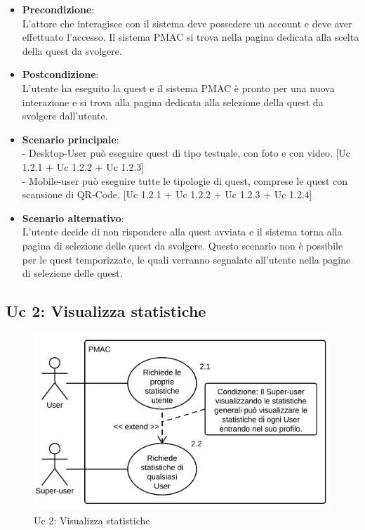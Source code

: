 {\begin{itemize}
\item \textbf{Precondizione}:\\
L'attore che interagisce con il sistema deve possedere un account e deve aver effettuato l'accesso. Il sistema PMAC si trova nella pagina dedicata alla scelta della quest da svolgere.

\item \textbf{Postcondizione}:\\
L'utente ha eseguito la quest e il sistema PMAC è pronto per una nuova interazione e si trova alla pagina dedicata alla selezione della quest da svolgere dall'utente.

\item \textbf{Scenario principale}:\\
- Desktop-User può eseguire quest di tipo testuale, con foto e con video. [Uc 1.2.1 + Uc 1.2.2 + Uc 1.2.3]\\
- Mobile-user può eseguire tutte le tipologie di quest, comprese le quest con scansione di QR-Code. [Uc 1.2.1 + Uc 1.2.2 + Uc 1.2.3 + Uc 1.2.4]

\item \textbf{Scenario alternativo}:\\
L'utente decide di non rispondere alla quest avviata e il sistema torna alla pagina di selezione delle quest da svolgere. Questo scenario non è possibile per le quest temporizzate, le quali verranno segnalate all'utente nella pagine di selezione delle quest.

\end{itemize}

\newpage

\subsection{Uc 2: Visualizza statistiche}
\begin{figure}[ht]
\centering
\caption{Uc 2: Visualizza statistiche}
\includegraphics[scale=0.87]{images/cap1/UseCase/Uc2} %
\end{figure}

}
